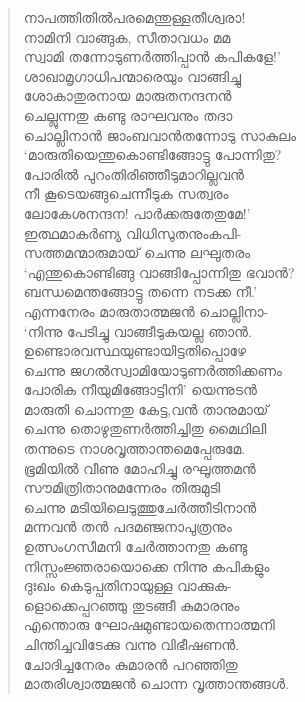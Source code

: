 \begin{verse}
നാപത്തിതില്‍പരമെന്തുള്ളതീശ്വരാ!\\
നാമിനി വാങ്ങുക, സീതാവധം മമ\\
സ്വാമി തന്നോടുണര്‍ത്തിപ്പാന്‍ കപികളേ!’\\
ശാഖാമൃഗാധിപന്മാരെയും വാങ്ങിച്ചു\\
ശോകാതുരനായ മാരുതനന്ദനന്‍\\
ചെല്ലുന്നതു കണ്ടു രാഘവനും തദാ\\
ചൊല്ലിനാന്‍ ജാംബവാന്‍തന്നോടു സാകുലം\\
‘മാരുതിയെന്തുകൊണ്ടിങ്ങോട്ടു പോന്നിതു?\\
പോരില്‍ പുറംതിരിഞ്ഞീടുമാറില്ലവന്‍\\
നീ കൂടെയങ്ങുചെന്നീടുക സത്വരം\\
ലോകേശനന്ദന! പാര്‍ക്കരുതേതുമേ!’\\
ഇത്ഥമാകര്‍ണ്യ വിധിസുതനുംകപി-\\
സത്തമന്മാരുമായ് ചെന്നു ലഘുതരം\\
‘എന്തുകൊണ്ടിങ്ങു വാങ്ങിപ്പോന്നിതു ഭവാന്‍?\\
ബന്ധമെന്തങ്ങോട്ടു തന്നെ നടക്ക നീ.’\\
എന്നനേരം മാരുതാത്മജന്‍ ചൊല്ലിനാ-\\
‘നിന്നു പേടിച്ചു വാങ്ങീടുകയല്ല ഞാന്‍.\\
ഉണ്ടൊരവസ്ഥയുണ്ടായിട്ടതിപ്പൊഴേ\\
ചെന്നു ജഗല്‍സ്വാമിയോടുണര്‍ത്തിക്കണം\\
പോരിക നീയുമിങ്ങോട്ടിനി’ യെന്നുടന്‍\\
മാരുതി ചൊന്നതു കേട്ട,വന്‍ താനുമായ്\\
ചെന്നു തൊഴുതുണര്‍ത്തിച്ചിതു മൈഥിലി\\
തന്നുടെ നാശവൃത്താന്തമെപ്പേരുമേ.\\
ഭൂമിയില്‍ വീണു മോഹിച്ചു രഘൂത്തമന്‍\\
സൗമിത്രിതാനുമന്നേരം തിരുമുടി\\
ചെന്നു മടിയിലെടുത്തുചേര്‍ത്തീടിനാന്‍\\
മന്നവന്‍ തന്‍ പദമഞ്ജനാപുത്രനും\\
ഉത്സംഗസീമനി ചേര്‍ത്താനതു കണ്ടു\\
നിസ്സംജ്ഞരായൊക്കെ നിന്നു കപികളും\\
ദുഃഖം കെടുപ്പതിനായുള്ള വാക്കുക-\\
ളൊക്കെപ്പറഞ്ഞു തുടങ്ങീ കുമാരനും\\
എന്തൊരു ഘോഷമുണ്ടായതെന്നാത്മനി\\
ചിന്തിച്ചവിടേക്കു വന്നു വിഭീഷണന്‍.\\
ചോദിച്ചനേരം കുമാരന്‍ പറഞ്ഞിതു\\
മാതരിശ്വാത്മജന്‍ ചൊന്ന വൃത്താന്തങ്ങള്‍.\\

\end{verse}
